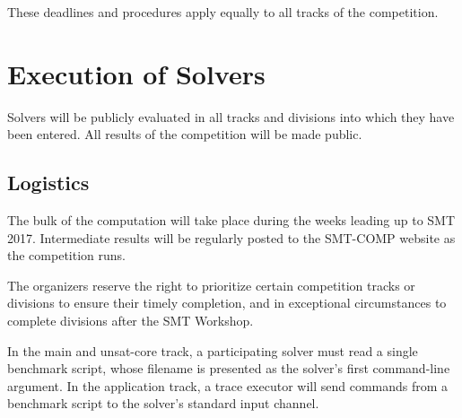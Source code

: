 \documentclass[12pt]{article}
\begin{document}
These deadlines and procedures apply equally to all tracks of the
competition.


\section{Execution of Solvers}

Solvers will be publicly evaluated in all tracks and divisions into
which they have been entered.  All results of the competition will be
made public.

\subsection{Logistics}
\label{sec:logistics}

%
The bulk of the computation will take place during the weeks leading
up to SMT 2017.  Intermediate results will be regularly posted to the
SMT-COMP website as the competition runs.

The organizers reserve the right to prioritize certain competition
tracks or divisions to ensure their timely completion, and in
exceptional circumstances to complete divisions after the SMT
Workshop.

%
In the main and unsat-core track, a participating solver must read a
single benchmark script, whose filename is presented as the solver's
first command-line argument.  In the application track, a trace
executor will send commands from a benchmark script to the solver's
standard input channel.
\end{document}
